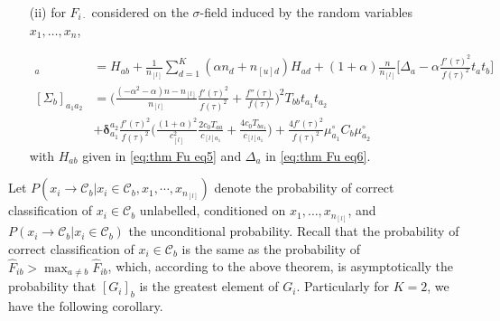 \documentclass[twoside,11pt]{article}
\begin{document}
\begin{theorem}
\begin{itemize}
		\item[(ii)] for $F_{i\cdot}$ considered on the $\sigma$-field induced by the random variables $x_1,\ldots,x_n$,  

			\begin{align*}
				[m_{b}]_{a} & =H_{ab}+\frac{1}{n_{[l]}}\sum_{d=1}^{K}(\alpha n_{d}+n_{[u]d})H_{ad}+(1+\alpha)\frac{ n}{n_{[l]}}\Bigg[\Delta_{a}-\alpha\frac{f'(\tau)^2}{f(\tau)^2}t_{a}t_{b}\Bigg]\\
				[\Sigma_{b}]_{a_{1}a_{2}} & =\Bigg(\frac{(-\alpha^{2}-\alpha)n-n_{[l]}}{n_{[l]}}\frac{f'(\tau)^{2}}{f(\tau)^{2}}+\frac{f''(\tau)}{f(\tau)}\Bigg)^{2}T_{bb}t_{a_{1}}t_{a_{2}} \nonumber \\
				&+{\bm\delta}_{a_1}^{a_2}\frac{f'(\tau)^{2}}{f(\tau)^{2}}\Bigg(\frac{(1+\alpha)^{2}}{c_{[l]}^{2}}\frac{2c_0T_{aa}}{c_{[l]a_1}}+\frac{4c_0T_{ba_1}}{c_{[l]a_1}}\Bigg) +\frac{4f'(\tau)^{2}}{f(\tau)^{2}}\mu^{\circ}_{a_{1}}C_{b}\mu^{\circ}_{a_{2}}
			\end{align*}
			with $H_{ab}$ given in \eqref{eq:thm Fu eq5} and $\Delta_{a}$ in \eqref{eq:thm Fu eq6}.
	\end{itemize}

\end{theorem}

Let $P(x_{i}\to\mathcal{C}_{b}|x_{i}\in\mathcal{C}_{b},x_{1},\cdots,x_{n_{[l]}})$ denote the probability of correct classification of $x_i\in\mathcal{C}_{b}$ unlabelled, conditioned on $x_1,\ldots,x_{n_{[l]}}$, and $P(x_{i}\to\mathcal{C}_{b}|x_{i}\in\mathcal{C}_{b})$ the unconditional probability. Recall that the probability of correct classification of $x_i\in\mathcal{C}_{b}$ is the same as the probability of $\hat{F}_{ib}>\max_{a\neq b}\hat{F}_{ib}$, which, according to the above theorem, is asymptotically the probability that $[G_i]_b$ is the greatest element of $G_i$. Particularly for $K=2$, we have the following corollary.
\end{document}
